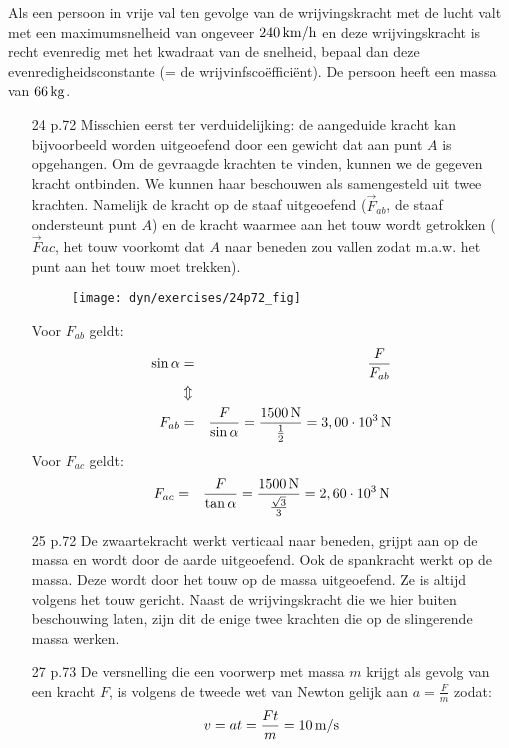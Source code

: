 \documentclass{ximera}
\begin{document}
\begin{exercise} Als een persoon in vrije val ten gevolge van de
wrijvingskracht met de lucht valt met een maximumsnelheid van
ongeveer $240\rm\,km/h$ en deze wrijvingskracht is recht evenredig
met het kwadraat van de snelheid, bepaal dan deze
evenredigheidsconstante (= de wrijvinfsco\"effici\"ent). De persoon
heeft een massa van $66\rm\,kg$.


\begin{oplossing}
    \begin{itemize}
\item[24 p.72]Misschien eerst ter verduidelijking: de aangeduide kracht kan bijvoorbeeld worden uitgeoefend door een gewicht dat aan punt $A$ is opgehangen. Om de gevraagde krachten te vinden, kunnen we de gegeven kracht ontbinden. We kunnen haar beschouwen als samengesteld uit twee krachten. Namelijk de kracht op de staaf uitgeoefend ($\vec{F}_{ab}$, de staaf ondersteunt punt $A$) en de kracht waarmee aan het touw wordt getrokken ($\vec{F}{ac}$, het touw voorkomt dat $A$ naar beneden zou vallen zodat m.a.w. het punt aan het touw moet trekken).
    \begin{figure}[h]
    \centering\texttt{[image: dyn/exercises/24p72\_fig]}
    \end{figure}

    Voor $F_{ab}$ geldt:
    \begin{eqnarray*}
    \sin{\alpha}&=&\frac{F}{F_{ab}}\\
    &\Updownarrow&\\
    F_{ab}&=&\frac{F}{\sin{\alpha}}=\frac{1500\rm\,N}{\frac{1}{2}}=3,00\cdot10^3\rm\,N
    \end{eqnarray*}
    Voor $F_{ac}$ geldt:
    \begin{eqnarray*}
    F_{ac}&=&\frac{F}{\tan{\alpha}}=\frac{1500\rm\,N}{\frac{\sqrt{3}}{3}}=2,60\cdot10^3\rm\,N
    \end{eqnarray*}

\item[25 p.72]De zwaartekracht werkt verticaal naar beneden, grijpt aan op de massa en wordt door de aarde uitgeoefend. Ook de spankracht werkt op de massa. Deze wordt door het touw op de massa uitgeoefend. Ze is altijd volgens het touw gericht. Naast de wrijvingskracht die we hier buiten beschouwing laten, zijn dit de enige twee krachten die op de slingerende massa werken.

\item[27 p.73]De versnelling die een voorwerp met massa $m$ krijgt als gevolg van een kracht $F$, is volgens de tweede wet van Newton gelijk aan $a=\frac{F}{m}$ zodat:
\begin{eqnarray*}
v=at=\frac{Ft}{m}=10\rm\,m/s
\end{eqnarray*}


\end{itemize}
\end{oplossing}
\end{exercise}
\end{document}
